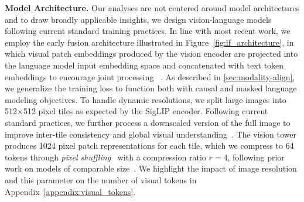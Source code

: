\noindent\textbf{Model Architecture.}  
Our analyses are not centered around model architectures and to draw broadly applicable insights, we design vision-language models following current standard training practices.  In line with most recent work, we employ the early fusion architecture  illustrated in Figure~\ref{fig:lf_architecture}, in which visual patch embeddings produced by the vision encoder are projected into the language model input embedding space and concatenated with text token embeddings to encourage joint processing ~. As described in \autoref{sec:modality-align}, we generalize the training loss to function both with causal and masked language modeling objectives.
To handle dynamic resolutions, we split large images into 512$\times$512 pixel tiles as expected by the SigLIP encoder. Following current standard practices, we further process a downscaled version of the full image to improve inter-tile consistency and global visual understanding~. The vision tower produces 1024 pixel patch representations for each tile, which we  compress to 64 tokens through \textit{pixel shuffling}~ with a compression ratio $r=4$, following prior work on models of comparable size~. We highlight the impact of image resolution and this parameter on the number of visual tokens in Appendix~\ref{appendix:visual_tokens}.


